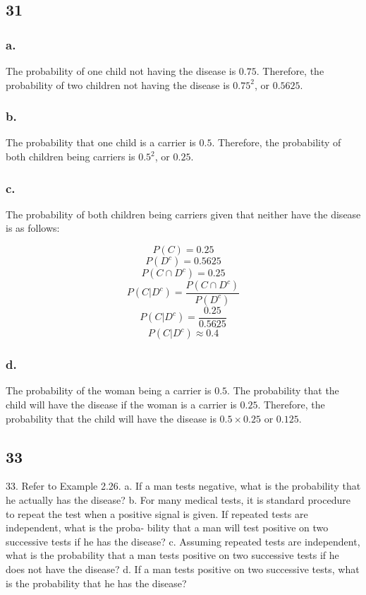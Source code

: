 \documentclass[11pt]{article}
\begin{document}
\subsection*{31}
\subsubsection*{a.}
The probability of one child not having the disease is $0.75$. Therefore, the
probability of two children not having the disease is $0.75^2$, or $0.5625$. 

\subsubsection*{b.}
The probability that one child is a carrier is $0.5$. Therefore, the probability
of both children being carriers is $0.5^2$, or $0.25$. 

\subsubsection*{c.}
The probability of both children being carriers given that neither have the
disease is as follows:

\[P(C) = 0.25 \]
\[P(D^c) = 0.5625 \]
\[P(C \cap D^c) = 0.25 \]
\[P(C|D^c) = \frac{P(C \cap D^c)}{P(D^c)} \]
\[P(C|D^c) = \frac{0.25}{0.5625} \]
\[P(C|D^c) \approx 0.\overline{4}  \]

\subsubsection*{d.}
The probability of the woman being a carrier is $0.5$. The probability that the
child will have the disease if the woman is a carrier is $0.25$. Therefore, the
probability that the child will have the disease is $0.5 \times 0.25$ or
$0.125$. 

\subsection*{33}
33. Refer to Example 2.26.
a. If a man tests negative, what is the probability that
he actually has the disease?
b. For many medical tests, it is standard procedure to
repeat the test when a positive signal is given. If
repeated tests are independent, what is the proba-
bility that a man will test positive on two successive
tests if he has the disease?
c. Assuming repeated tests are independent, what is
the probability that a man tests positive on two
successive tests if he does not have the disease?
d. If a man tests positive on two successive tests, what
is the probability that he has the disease?
\end{document}
